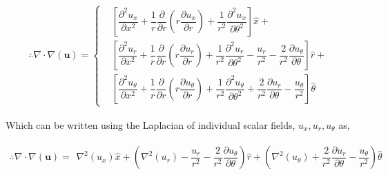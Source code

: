 \documentclass{kthreport}
\begin{document}
\begin{eqnarray}
	\therefore \nabla\cdot\nabla (\bm{u}) = \left\{
	\begin{split}
		& \left[\dfrac{\partial^{2}u_{x}}{\partial x^{2}} + \dfrac{1}{r}\dfrac{\partial }{\partial r}\left(r\dfrac{\partial u_{x}}{\partial r}\right) +  \dfrac{1}{r^{2}}\dfrac{\partial^{2} u_{x}}{\partial \theta^{2}}	\right]\hat{x} + \\
		& \left[\dfrac{\partial^{2}u_{r}}{\partial x^{2}} + \dfrac{1}{r}\dfrac{\partial }{\partial r}\left(r\dfrac{\partial u_{r}}{\partial r}\right) +\dfrac{1}{r^{2}}\dfrac{\partial^{2} u_{r}}{\partial \theta^{2}} - \dfrac{u_{r}}{r^{2}} - \dfrac{2}{r^{2}}\dfrac{\partial u_{\theta}}{\partial \theta}  \right]\hat{r}  +\\
		& \left[\dfrac{\partial^{2}u_{\theta}}{\partial x^{2}} + \dfrac{1}{r}\dfrac{\partial }{\partial r}\left(r\dfrac{\partial u_{\theta}}{\partial r}\right) + \dfrac{1}{r^{2}}\dfrac{\partial^{2} u_{\theta}}{\partial \theta^{2}} + \dfrac{2}{r^{2}}\dfrac{\partial u_{r}}{\partial \theta}   - \dfrac{u_{\theta}}{r^{2}} \right]\hat{\theta}  
	\end{split}\right. \label{eqn:vector_laplacian}
\end{eqnarray}

Which can be written using the Laplacian of individual scalar fields, $u_{x},u_{r},u_{\theta}$ as,

\begin{eqnarray}
	\therefore \nabla\cdot\nabla (\bm{u}) = 
\begin{split}
	 \nabla^{2}(u_{x}) \hat{x} + \left(\nabla^{2}(u_{r}) - \dfrac{u_{r}}{r^{2}} - \dfrac{2}{r^{2}}\dfrac{\partial u_{\theta}}{\partial \theta}  \right)\hat{r}  + 
	 \left( \nabla^{2}(u_{\theta}) + \dfrac{2}{r^{2}}\dfrac{\partial u_{r}}{\partial \theta}   - \dfrac{u_{\theta}}{r^{2}} \right)\hat{\theta}  
\end{split} \label{eqn:vector_laplacian_scalar}
\end{eqnarray}






\FloatBarrier



\end{document}
